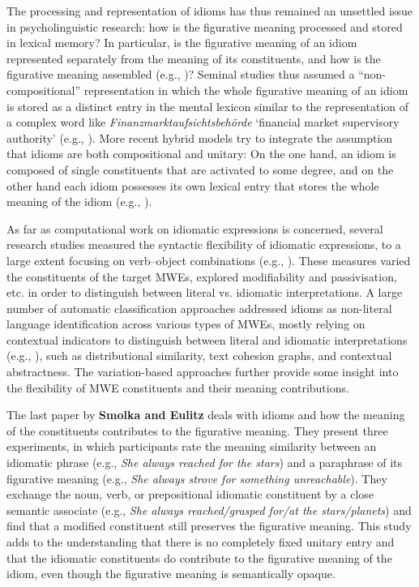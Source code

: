 \documentclass[output=paper]{langsci/langscibook}
\begin{document}
The processing and representation of idioms has thus remained an
unsettled issue in psycholinguistic research: how is the figurative
meaning processed and stored in lexical memory? In particular, is the
figurative meaning of an idiom represented separately from the meaning
of its constituents, and how is the figurative meaning assembled
(e.g., \citealt{Cacciari/Tabossi:88, Gibbs:92, Cacciari/Glucksberg:94,
  Titone/Connine:99, Hamblin/Gibbs:03})? Seminal studies thus assumed
a ``non-compositional'' representation in which the whole figurative
meaning of an idiom is stored as a distinct entry in the mental
lexicon similar to the representation of a complex word like
\textit{Finanzmarktaufsichtsbehörde} `financial market supervisory
authority' (e.g., \citealt{Bobrow/Bell:73, Swinney/Cutler:79,
  Gibbs:80}). More recent hybrid models try to integrate the
assumption that idioms are both compositional and unitary: On the one
hand, an idiom is composed of single constituents that are
activated to some degree, and on the other hand each idiom possesses
its own lexical entry that stores the whole meaning of the idiom
(e.g., \citealt{Cacciari/Tabossi:88, GibbsEtAl:89, Cutting/Bock:97,
  Titone/Connine:99, SprengerEtAl:06, Caillies/Butcher:07,
  Holsinger/Kaiser:13, Titone/Libben:14}).

As far as computational work on idiomatic expressions is concerned,
several research studies measured the syntactic flexibility of
idiomatic expressions, to a large extent focusing on verb--object
combinations (e.g., \citealt{Bannard:07,FazlyEtAl:09}). These measures
varied the constituents of the target MWEs, explored modifiability and
passivisation, etc. in order to distinguish between literal
vs. idiomatic interpretations. A large number of automatic
classification approaches addressed idioms as non-literal language
identification across various types of MWEs, mostly relying on
contextual indicators to distinguish between literal and idiomatic
interpretations (e.g.,
\citealt{Sporleder/Li:09,TurneyEtAl:11,Koeper/SchulteImWalde:16b}),
such as distributional similarity, text cohesion graphs, and
contextual abstractness. The variation-based approaches further
provide some insight into the flexibility of MWE constituents and
their meaning contributions.

The last paper by \textbf{Smolka and Eulitz} deals with idioms and how
the meaning of the constituents contributes to the figurative meaning. They
present three experiments, in which participants rate the meaning
similarity between an idiomatic phrase (e.g., \textit{She always
  reached for the stars}) and a paraphrase of its figurative meaning
(e.g., \textit{She always strove for something unreachable}). They
exchange the noun, verb, or prepositional idiomatic constituent by a
close semantic associate (e.g., \textit{She always reached/grasped
  for/at the stars/planets}) and find that a modified constituent
still preserves the figurative meaning. This study adds to the
understanding that there is no completely fixed unitary entry and
that the idiomatic constituents do contribute to the figurative
meaning of the idiom, even though the figurative meaning is
semantically opaque.
\end{document}
